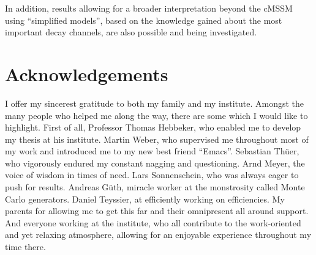 In addition, results allowing for a broader interpretation beyond the cMSSM using ``simplified models'', based on the knowledge gained about the most important decay channels, are also possible and being investigated.

\clearpage
\section*{Acknowledgements} 
\label{sec:acknowledgements}

I offer my sincerest gratitude to both my family and my institute. Amongst the many people who helped me along the way, there are some which I would like to highlight. First of all, Professor Thomas Hebbeker, who enabled me to develop my thesis at his institute. Martin Weber, who supervised me throughout most of my work and introduced me to my new best friend ``Emacs''. Sebastian Th\"uer, who vigorously endured my constant nagging and questioning. Arnd Meyer, the voice of wisdom in times of need. Lars Sonnenschein, who was always eager to push for results. Andreas G\"uth, miracle worker at the monstrosity called Monte Carlo generators. Daniel Teyssier, at efficiently working on efficiencies. My parents for allowing me to get this far and their omnipresent all around support. And everyone working at the institute, who all contribute to the work-oriented and yet relaxing atmosphere, allowing for an enjoyable experience throughout my time there.

